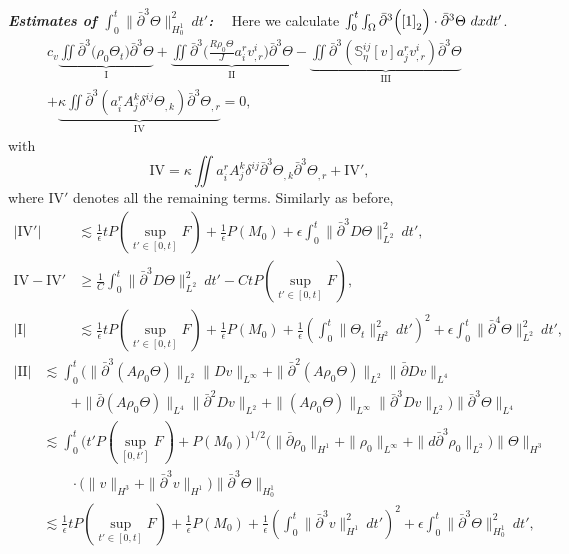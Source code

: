 \documentclass[12pt,a4paper]{amsart}
\numberwithin{equation}{section}
\theoremstyle{plain}
\theoremstyle{definition}
\newcommand{\bpartial}{\bar{\partial}}
\begin{document}
\textsl{\textbf{Estimates of $\int_{0}^{t}\|\bpartial^3 \Theta\|_{H_0^1}^2 \ dt'$:}}~~
Here we calculate
$\int_{0}^{t}\int_{\Omega}\bpartial^3 \Big(\eqref{1}_2\Big)\cdot  \bpartial^3 \Theta\ dx dt'$.
\begin{align*}
c_v\underbrace{\iint \bpartial ^3 \Big(\rho_0\Theta_{t}\Big)\bpartial^3 \Theta}_{\mathrm{I}}
+\underbrace{\iint  \bpartial^3  \Big(\frac{R\rho_0\Theta}{J} a^r_i v^i_{,r}\Big) \bpartial^3 \Theta}_{\mathrm{II}}
-\underbrace{\iint \bpartial^3 (\mathbb{S}^{ij}_{\eta}[v] a^r_j v^i_{,r})  \bpartial^3 \Theta}_{\mathrm{III}}&\\
+\underbrace{\kappa\iint \bpartial^3(a^r_i A^k_j \delta^{ij}\Theta_{,k}) \bpartial^3 \Theta_{,r}}_{\mathrm{IV}}=0,
\qquad\qquad\qquad\qquad&
\end{align*}
with
$$
\mathrm{IV}=\kappa \iint a^r_i A^k_j \delta^{ij} \bpartial^3 \Theta_{,k}
\bpartial^3 \Theta_{,r}+\mathrm{IV}',
$$
where $\mathrm{IV}'$ denotes all the remaining terms.
Similarly as before,
\begin{align*}
|\mathrm{IV}'|
&\lesssim  \frac{1}{\epsilon}tP(\sup\limits_{t'\in[0,t]}F)+\frac{1}{\epsilon}P( M_0) +\epsilon \int_{0}^{t}\|\bpartial^3 D\Theta\|_{L^2}^2\ dt',\\
\mathrm{IV}-\mathrm{IV}'
&\geq \frac{1}{C} \int_{0}^{t} \|\bpartial^3 D\Theta\|_{L^2}^2 \ dt'-CtP(\sup\limits_{t'\in[0,t]}F),\\
|\mathrm{I}| &\lesssim  \frac{1}{\epsilon}tP(\sup\limits_{t'\in[0,t]}F)+\frac{1}{\epsilon}P(M_0)+\frac{1}{\epsilon}\left(\int_{0}^{t} \| \Theta_t\|_{H^2}^2\ dt'\right)^2+\epsilon \int_{0}^{t}\|\bpartial^4 \Theta\|_{L^2}^2\ dt', 
\end{align*}
\begin{align*}
|\mathrm{II}|
&\lesssim \int_{0}^{t} \Big( \|\bpartial^3 (A\rho_0 \Theta)\|_{L^2} \| Dv\|_{L^{\infty}}
    +\|\bpartial^2 (A\rho_0 \Theta)\|_{L^2}  \|\bpartial Dv\|_{L^4}\\
   &\qquad
    +\|\bpartial (A\rho_0 \Theta)\|_{L^4} \| \bpartial^2 Dv\|_{L^2}
    +\| (A\rho_0 \Theta)\|_{L^{\infty}}  \|\bpartial^3 Dv\|_{L^2}\Big)\|\bpartial^3 \Theta\|_{L^4}\\
&\lesssim \int_{0}^{t}  \Big( t'P(\sup\limits_{[0,t']}F)+P(M_0)  \Big)^{1/2}
   \Big( \|\bpartial \rho_0\|_{H^1}
+\|\rho_0\|_{L^{\infty}}+\|d \bpartial^3 \rho_0\|_{L^2}\Big)\|\Theta\|_{H^3}\\
&\qquad \cdot\Big(\|v\|_{H^3}+\|\bpartial^3 v\|_{H^1}\Big) \|\bpartial^3 \Theta \|_{H_0^1}\\
&\lesssim  \frac{1}{\epsilon}tP(\sup\limits_{t'\in[0,t]}F)+\frac{1}{\epsilon}P(M_0)+\frac{1}{\epsilon}\left(\int_{0}^{t} \|\bpartial^3 v\|_{H^1}^2\ dt'\right)^2+\epsilon \int_{0}^{t}\|\bpartial^3 \Theta \|_{H_0^1}^2\ dt',
\end{align*}
\end{document}
